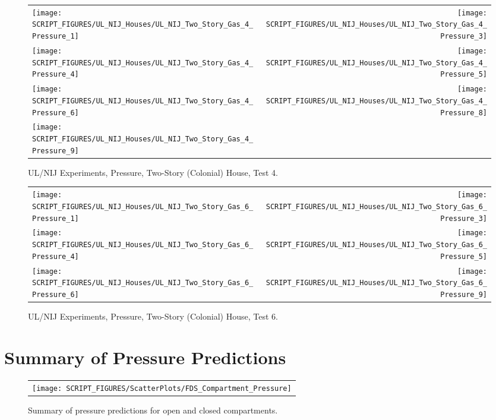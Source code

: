 \begin{figure}[p]
\begin{tabular*}{\textwidth}{l@{\extracolsep{\fill}}r}
\texttt{[image: SCRIPT\_FIGURES/UL\_NIJ\_Houses/UL\_NIJ\_Two\_Story\_Gas\_4\_Pressure\_1]} &
\texttt{[image: SCRIPT\_FIGURES/UL\_NIJ\_Houses/UL\_NIJ\_Two\_Story\_Gas\_4\_Pressure\_3]} \\
\texttt{[image: SCRIPT\_FIGURES/UL\_NIJ\_Houses/UL\_NIJ\_Two\_Story\_Gas\_4\_Pressure\_4]} &
\texttt{[image: SCRIPT\_FIGURES/UL\_NIJ\_Houses/UL\_NIJ\_Two\_Story\_Gas\_4\_Pressure\_5]} \\
\texttt{[image: SCRIPT\_FIGURES/UL\_NIJ\_Houses/UL\_NIJ\_Two\_Story\_Gas\_4\_Pressure\_6]} &
\texttt{[image: SCRIPT\_FIGURES/UL\_NIJ\_Houses/UL\_NIJ\_Two\_Story\_Gas\_4\_Pressure\_8]} \\
\texttt{[image: SCRIPT\_FIGURES/UL\_NIJ\_Houses/UL\_NIJ\_Two\_Story\_Gas\_4\_Pressure\_9]}
\end{tabular*}
\caption[UL/NIJ Experiments, Pressure, Two-Story (Colonial) House, Test 4]{UL/NIJ Experiments, Pressure, Two-Story (Colonial) House, Test 4.}
\label{UL_NIJ_Pres_Colonial_4}
\end{figure}

\begin{figure}[p]
\begin{tabular*}{\textwidth}{l@{\extracolsep{\fill}}r}
\texttt{[image: SCRIPT\_FIGURES/UL\_NIJ\_Houses/UL\_NIJ\_Two\_Story\_Gas\_6\_Pressure\_1]} &
\texttt{[image: SCRIPT\_FIGURES/UL\_NIJ\_Houses/UL\_NIJ\_Two\_Story\_Gas\_6\_Pressure\_3]} \\
\texttt{[image: SCRIPT\_FIGURES/UL\_NIJ\_Houses/UL\_NIJ\_Two\_Story\_Gas\_6\_Pressure\_4]} &
\texttt{[image: SCRIPT\_FIGURES/UL\_NIJ\_Houses/UL\_NIJ\_Two\_Story\_Gas\_6\_Pressure\_5]} \\
\texttt{[image: SCRIPT\_FIGURES/UL\_NIJ\_Houses/UL\_NIJ\_Two\_Story\_Gas\_6\_Pressure\_6]} &
\texttt{[image: SCRIPT\_FIGURES/UL\_NIJ\_Houses/UL\_NIJ\_Two\_Story\_Gas\_6\_Pressure\_9]}
\end{tabular*}
\caption[UL/NIJ Experiments, Pressure, Two-Story (Colonial) House, Test 6]{UL/NIJ Experiments, Pressure, Two-Story (Colonial) House, Test 6.}
\label{UL_NIJ_Pres_Colonial_6}
\end{figure}

\clearpage

\section{Summary of Pressure Predictions}
\label{Compartment Over-Pressure}

\begin{figure}[h!]
\begin{center}
\begin{tabular}{c}
\texttt{[image: SCRIPT\_FIGURES/ScatterPlots/FDS\_Compartment\_Pressure]}
\end{tabular}
\end{center}
\caption[Summary of pressure predictions]{Summary of pressure predictions for open and closed compartments.}
\label{Pressure_Summary}
\end{figure}

